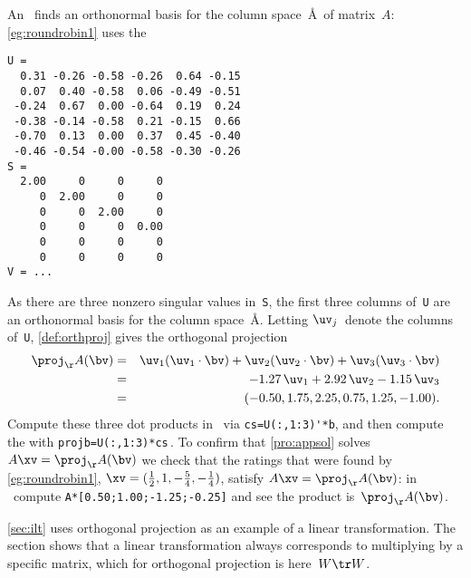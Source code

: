 \begin{example}
An \svd\ finds an orthonormal basis for the column space~\AA\ of matrix~\(A\): \cref{eg:roundrobin1} uses the \svd\ \twodp
\setbox\ajrqrbox\hbox{}%
\marginajrbox%
\begin{verbatim}
U =
  0.31 -0.26 -0.58 -0.26  0.64 -0.15
  0.07  0.40 -0.58  0.06 -0.49 -0.51
 -0.24  0.67  0.00 -0.64  0.19  0.24
 -0.38 -0.14 -0.58  0.21 -0.15  0.66
 -0.70  0.13  0.00  0.37  0.45 -0.40
 -0.46 -0.54 -0.00 -0.58 -0.30 -0.26
S =
  2.00     0     0     0
     0  2.00     0     0
     0     0  2.00     0
     0     0     0  0.00
     0     0     0     0
     0     0     0     0
V = ...
\end{verbatim}
As there are three nonzero singular values in~\verb|S|, the first three columns of~\verb|U| are an orthonormal basis for the column space~\AA.
Letting \(\uv_j\)~denote the columns of~\verb|U|, \cref{def:orthproj} gives the orthogonal projection \twodp
\begin{eqnarray*}
\proj_\AA(\bv)
&=&\uv_1(\uv_1\cdot\bv)+\uv_2(\uv_2\cdot\bv)+\uv_3(\uv_3\cdot\bv)
\\&=&-1.27\,\uv_1+2.92\,\uv_2-1.15\,\uv_3
\\&=&(-0.50,1.75,2.25,0.75,1.25,-1.00).
\end{eqnarray*}
Compute these three dot products in \script\ via \verb|cs=U(:,1:3)'*b|, and then compute the  with \verb|projb=U(:,1:3)*cs|\,.
To confirm that \cref{pro:appsol} solves \(A\xv=\proj_\AA(\bv)\) we check that the ratings that were found by \cref{eg:roundrobin1}, \(\xv=(\frac12,1,-\frac54,-\frac14)\), satisfy \(A\xv=\proj_\AA(\bv)\): in \script\ compute \verb|A*[0.50;1.00;-1.25;-0.25]| and see the product is~\(\proj_\AA(\bv)\).
\end{example}


\cref{sec:ilt} uses orthogonal projection as an example of a linear transformation. 
The section shows that a linear transformation always corresponds to multiplying by a specific matrix, which for orthogonal projection is here~\(W\tr W\).



